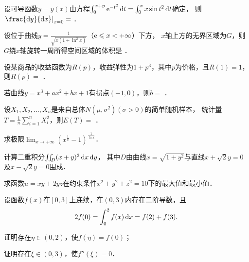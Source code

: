 \documentclass[plain,noanswer,medmath]{../../template/jnuexam}
\begin{document}
\begin{problem}
设可导函数$y = y(x)$由方程$\int_0^{x + y} \mathrm{e}^{- t^2} \mathop{}\!\mathrm{d} t = \int_0^x x\sin t^2 \mathop{}\!\mathrm{d} t$确定，
则$\left. \frac{\dy}{\dx} \right|_{x = 0} =$ \fillin{}．
\end{problem}


\begin{problem}
设位于曲线$y = \frac{1}{\sqrt{x(1 + \ln^2 x)}}$（$\mathrm{e} \leqslant x < +\infty$）下方，
$x$轴上方的无界区域为$G$，则$G$绕$x$轴旋转一周所得空间区域的体积是 \fillin{}．
\end{problem}


\begin{problem}
设某商品的收益函数为$R(p)$，收益弹性为$1 + p^3$，其中$p$为价格，且$R(1) = 1$，则$R(p) =$ \fillin{}．
\end{problem}


\begin{problem}
若曲线$y = x^3 + ax^2 + bx + 1$有拐点$(- 1,0)$，则$b =$ \fillin{}．
\end{problem}




\begin{problem}
设$X_1,X_2, \ldots ,X_n$是来自总体$N(\mu ,\sigma^2)$$(\sigma > 0)$的简单随机样本，
统计量$T = \frac{1}{n}\sum_{i = 1}^n X_i^2$，则$E(T) =$ \fillin{}．
\end{problem}




\begin{problem}[points=10]
求极限$\lim_{x \to +\infty} (x^{\frac{1}{x}} - 1)^{\frac{1}{\ln x}}$．
\end{problem}


\begin{problem}[points=10]
计算二重积分$\iint_D (x + y)^3 \mathop{}\!\mathrm{d} x\mathop{}\!\mathrm{d} y$，
其中$D$由曲线$x = \sqrt{1 + y^2}$与直线$x + \sqrt{2} y = 0$及$x - \sqrt{2} y = 0$围成．
\end{problem}


\begin{problem}[points=10]
求函数$u = xy + 2yz$在约束条件$x^2 + y^2 + z^2 = 10$下的最大值和最小值．
\end{problem}




\begin{problem}[points=10]
设函数$f(x)$在$\left[0,3 \right]$上连续，在$\left(0,3 \right)$内存在二阶导数，且
$$2f(0) = \int_0^2 f(x)\mathop{}\!\mathrm{d} x = f(2) + f(3).$$
\begin{enumerate*}
\item 证明存在$\eta \in(0,2)$，使$f(\eta) = f(0)$；
\item 证明存在$\xi \in(0,3)$，使$f''(\xi) = 0$．
\end{enumerate*}
\end{problem}
\end{document}
